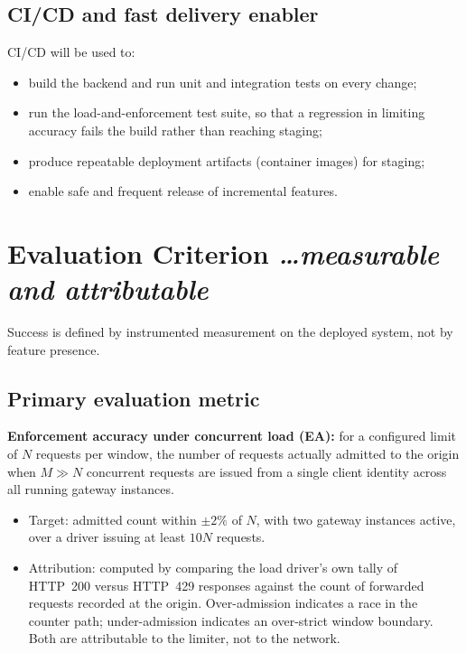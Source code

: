 \documentclass[11pt,a4paper]{article}
\newcommand{\BvrHint}[1]{%
  {\normalfont\normalsize\itshape\hfill #1}}
\begin{document}
\subsection{CI/CD and fast delivery enabler}
CI/CD will be used to:
\begin{itemize}[leftmargin=0.7cm]
    \item build the backend and run unit and integration tests on every change;
    \item run the load-and-enforcement test suite, so that a regression in
      limiting accuracy fails the build rather than reaching staging;
    \item produce repeatable deployment artifacts (container images) for
      staging;
    \item enable safe and frequent release of incremental features.
\end{itemize}

\section{Evaluation Criterion %
\BvrHint{\ldots measurable and attributable}}
Success is defined by instrumented measurement on the deployed system, not by
feature presence.

\subsection{Primary evaluation metric}
\textbf{Enforcement accuracy under concurrent load (EA):} for a configured
limit of $N$ requests per window, the number of requests actually admitted to
the origin when $M \gg N$ concurrent requests are issued from a single client
identity across all running gateway instances.
\begin{itemize}[leftmargin=0.7cm]
    \item Target: admitted count within $\pm 2\%$ of $N$, with two gateway
      instances active, over a driver issuing at least $10N$ requests.
    \item Attribution: computed by comparing the load driver's own tally of
      HTTP~200 versus HTTP~429 responses against the count of forwarded
      requests recorded at the origin. Over-admission indicates a race in the
      counter path; under-admission indicates an over-strict window boundary.
      Both are attributable to the limiter, not to the network.
\end{itemize}
\end{document}

